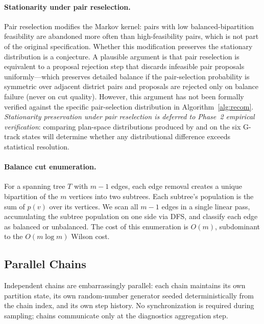 \paragraph{Stationarity under pair reselection.}
Pair reselection modifies the \recom{} Markov kernel: pairs with low
balanced-bipartition feasibility are abandoned more often than high-feasibility
pairs, which is not part of the original \recom{} specification.
Whether this modification preserves the stationary distribution is a
conjecture.
A plausible argument is that pair reselection is equivalent to a proposal
rejection step that discards infeasible pair proposals uniformly---which
preserves detailed balance if the pair-selection probability is symmetric
over adjacent district pairs and proposals are rejected only on balance
failure (never on cut quality).
However, this argument has not been formally verified against the specific
pair-selection distribution in Algorithm~\ref{alg:recom}.
\emph{Stationarity preservation under pair reselection is deferred to
Phase~2 empirical verification}: comparing plan-space distributions produced
by \re{} and \gc{} on the six G-track states will determine whether
any distributional difference exceeds statistical resolution.

\paragraph{Balance cut enumeration.}
For a spanning tree $T$ with $m-1$ edges, each edge removal creates a
unique bipartition of the $m$ vertices into two subtrees.
Each subtree's population is the sum of $p(v)$ over its vertices.
We scan all $m-1$ edges in a single linear pass, accumulating the
subtree population on one side via DFS, and classify each edge as
balanced or unbalanced.
The cost of this enumeration is $O(m)$, subdominant to the $O(m\log m)$
Wilson cost.

\subsection{Parallel Chains}

Independent chains are embarrassingly parallel: each chain maintains its
own partition state, its own random-number generator seeded
deterministically from the chain index, and its own step history.
No synchronization is required during sampling; chains communicate only
at the diagnostics aggregation step.

